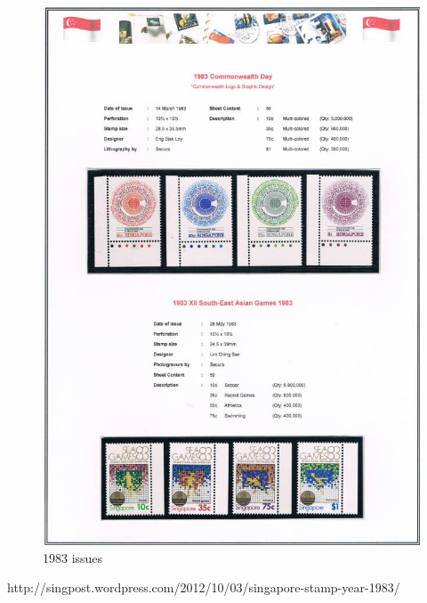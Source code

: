 \begin{figure}[htbp]
\centering
\includegraphics[width=.90\textwidth]{../singapore/1983-01.jpg}
\caption{1983 issues }
\end{figure}

http://singpost.wordpress.com/2012/10/03/singapore-stamp-year-1983/                